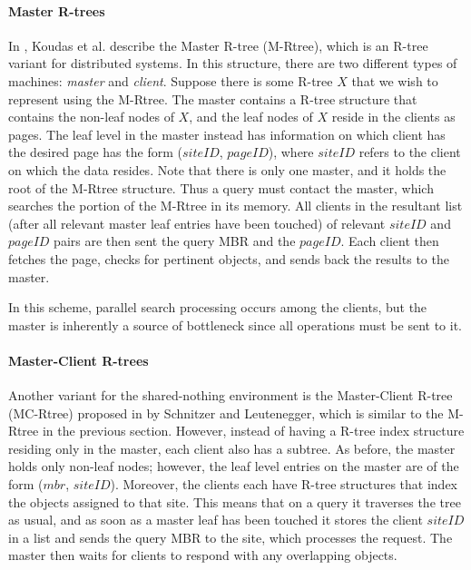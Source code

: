 \paragraph{Master R-trees}
In \cite{koudas1996declustering}, Koudas et al. describe the  Master R-tree 
(M-Rtree), which is an R-tree variant for distributed systems.
In this structure, there are two different types of machines: \emph{master} and 
\emph{client}. Suppose there is some R-tree $X$ that we wish to represent using 
the M-Rtree. The master contains a R-tree structure that contains the non-leaf 
nodes of $X$, and the leaf nodes of $X$ reside in the clients as pages. The leaf 
level in the master instead has information on which client has the desired page has the form ($siteID$, $pageID$), where $siteID$ refers to the client on which
the data resides. Note that there is only one master, and it holds the root of 
the M-Rtree structure.
Thus a query must contact the master, which searches the portion of the M-Rtree 
in its memory. All clients in the resultant list (after all relevant master leaf 
entries have been touched) of relevant $siteID$ and $pageID$ pairs are then sent 
the query MBR and the $pageID$. Each client then fetches the page, checks for 
pertinent objects, and sends back the results to the master. 

In this scheme, parallel search processing occurs among the clients, but the 
master is inherently a source of bottleneck since all operations must be sent to
it.

\paragraph{Master-Client R-trees}
Another variant for the shared-nothing environment is the Master-Client R-tree 
(MC-Rtree) proposed in \cite{schnitzer1999master} by Schnitzer and Leutenegger,  which is similar to the 
M-Rtree in the previous section. However, instead of having a R-tree index 
structure residing only in the master, each client also has a subtree. As before,
the master holds only non-leaf nodes; however, the leaf level entries on the 
master are of the form ($mbr$, $siteID$). Moreover, the clients each have R-tree
structures that index the objects assigned to that site. This means that on a 
query it traverses the tree as usual, and as soon as a master leaf has been 
touched it stores the client $siteID$ in a list and sends the query MBR to the 
site, which processes the request. The master then waits for clients to respond
with any overlapping objects. 

